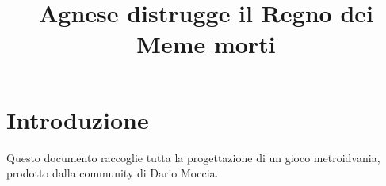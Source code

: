 \documentclass{article}
\title{Agnese distrugge il Regno dei Meme morti}
\date{}
\begin{document}
    \maketitle
    \newpage
    \tableofcontents
    
    \newpage
    \section*{Introduzione}
        Questo documento raccoglie tutta la progettazione di un gioco metroidvania, prodotto dalla community
        di Dario Moccia.
        
    
\end{document}
